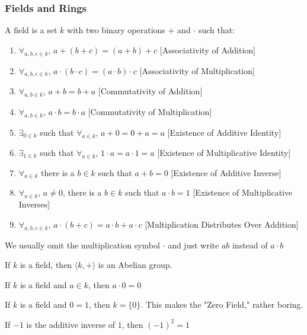 \documentclass[crop=false,class=book]{standalone}
\begin{document}
\subsubsection{Fields and Rings}
\begin{definition}
A field is a set $k$ with two binary operations $+$ and $\cdot$ such that:
\begin{enumerate}
    \item $\forall_{a,b,c\in k}$, $a+(b+c)=(a+b)+c$ \hfill [Associativity of Addition]
    \item $\forall_{a,b,c\in k}$, $a\cdot(b\cdot c) = (a\cdot b)\cdot c$ \hfill [Associativity of Multiplication]
    \item $\forall_{a,b\in k}$, $a+b=b+a$ \hfill [Commutativity of Addition]
    \item $\forall_{a,b\in k}$, $a\cdot b = b\cdot a$ \hfill [Commutativity of Multiplication]
    \item $\exists_{0 \in k}$ such that $\forall_{a\in k}$, $a+0=0+a = a$ \hfill [Existence of Additive Identity]
    \item $\exists_{1\in k}$ such that $\forall_{a\in k}$, $1\cdot a=a\cdot 1 = a$ \hfill [Existence of Multiplicative Identity]
    \item $\forall_{a\in k}$ there is a $b\in k$ such that $a+b=0$ \hfill [Existence of Additive Inverse]
    \item $\forall_{a\in k}$, $a\ne 0$, there is a $b\in k$ such that $a\cdot b = 1$ \hfill [Existence of Multiplicative Inverses]
    \item $\forall_{a,b,c\in k}$, $a\cdot(b+c) = a\cdot b + a\cdot c$ \hfill [Multiplication Distributes Over Addition]
\end{enumerate}
\end{definition}
\begin{remark}
We usually omit the multiplication symbol $\cdot$ and just write $ab$ instead of $a\cdot b$
\end{remark}
\begin{theorem}
If $k$ is a field, then $\langle k, + \rangle$ is an Abelian group.
\end{theorem}
\begin{theorem}
If $k$ is a field and $a\in k$, then $a\cdot 0 = 0$
\end{theorem}
\begin{remark}
If $k$ is a field and $0=1$, then $k=\{0\}$. This makes the "Zero Field," rather boring.
\end{remark}
\begin{theorem}
If $-1$ is the additive inverse of $1$, then $(-1)^2 = 1$
\end{theorem}
\end{document}
